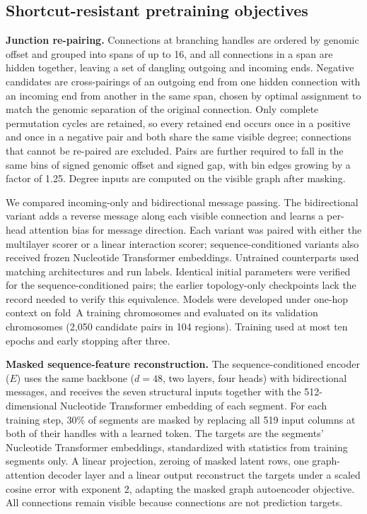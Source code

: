 \documentclass[11pt]{article}
\begin{document}
\begin{bibunit}[unsrtnat]
\subsection{Shortcut-resistant pretraining objectives}
\label{sec:objectives-methods}

\textbf{Junction re-pairing.} Connections at branching handles are ordered by genomic offset and grouped into spans of up to 16, and all connections in a span are hidden together, leaving a set of dangling outgoing and incoming ends. Negative candidates are cross-pairings of an outgoing end from one hidden connection with an incoming end from another in the same span, chosen by optimal assignment to match the genomic separation of the original connection. Only complete permutation cycles are retained, so every retained end occurs once in a positive and once in a negative pair and both share the same visible degree; connections that cannot be re-paired are excluded. Pairs are further required to fall in the same bins of signed genomic offset and signed gap, with bin edges growing by a factor of 1.25. Degree inputs are computed on the visible graph after masking.

We compared incoming-only and bidirectional message passing. The bidirectional variant adds a reverse message along each visible connection and learns a per-head attention bias for message direction. Each variant was paired with either the multilayer scorer or a linear interaction scorer; sequence-conditioned variants also received frozen Nucleotide Transformer embeddings. Untrained counterparts used matching architectures and run labels. Identical initial parameters were verified for the sequence-conditioned pairs; the earlier topology-only checkpoints lack the record needed to verify this equivalence. Models were developed under one-hop context on fold~A training chromosomes and evaluated on its validation chromosomes (2,050 candidate pairs in 104 regions). Training used at most ten epochs and early stopping after three.

\textbf{Masked sequence-feature reconstruction.} The sequence-conditioned encoder ($E$) uses the same backbone ($d=48$, two layers, four heads) with bidirectional messages, and receives the seven structural inputs together with the 512-dimensional Nucleotide Transformer embedding of each segment. For each training step, 30\% of segments are masked by replacing all 519 input columns at both of their handles with a learned token. The targets are the segments' Nucleotide Transformer embeddings, standardized with statistics from training segments only. A linear projection, zeroing of masked latent rows, one graph-attention decoder layer and a linear output reconstruct the targets under a scaled cosine error with exponent 2, adapting the masked graph autoencoder objective\cite{hou2022graphmae}. All connections remain visible because connections are not prediction targets.


\end{bibunit}
\end{document}
